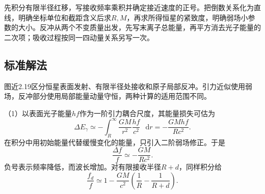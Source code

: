 \documentclass[UTF8,fontset=fandol,a4paper,11pt]{ctexart}
\newcommand{\dd}{\mathop{}\!\mathrm{d}}
\begin{document}
先积分有限半径红移，写接收频率乘积并确定接近速度的正号。把倒数关系化为直线，明确坐标单位和截距含义后求$R,M$，再求所得恒星的紧致度，明确弱场小参数的大小。反冲从两个不变质量出发，先写末离子总能量，再平方消去光子能量的二次项；吸收过程按同一四动量关系另写一次。



\subsection*{标准解法}


图近2.19区分恒星表面发射、有限半径处接收和原子局部反冲。引力近似使用弱场，反冲部分使用局部能量动量守恒，两种计算的适用范围不同。

（1）以表面光子能量$hf$作为一阶引力耦合尺度，其能量损失可估为
\[
\Delta E_\gamma\simeq-\int_R^\infty
\frac{GM}{r^2}\frac{hf}{c^2}\,\dd r
=-\frac{GMhf}{Rc^2}.
\]
在积分中用初始能量代替缓慢变化的能量，只引入二阶弱场修正。于是
\[
\boxed{\frac{\Delta f}{f}\simeq-\frac{GM}{Rc^2}}.
\]
负号表示频率降低，而波长增加。对有限接收半径$R+d$，同样积分给
\[
\boxed{\frac{f_d}{f}\simeq
1-\frac{GM}{c^2}\left(\frac1R-\frac1{R+d}\right)}.
\]
\end{document}
